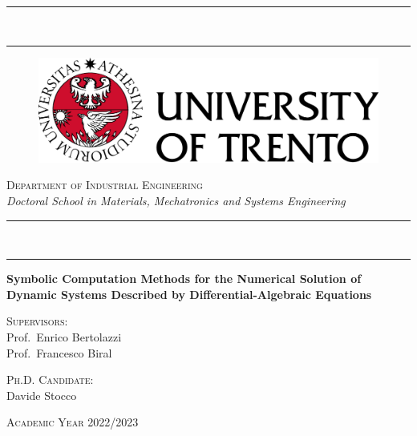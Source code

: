
\begin{titlepage}
%
\setlength\parindent{0pt}
\setlength{\topmargin}{-20mm}
\setlength{\voffset}{0mm}
%
\begin{center}
  \rule[0.1cm]{\textwidth}{0.6mm} \\ %
  \rule[0.5cm]{\textwidth}{0.3mm}
\end{center}
%
\vspace{-5mm}
%
\begin{figure}[htp]
  \centering
  \includegraphics[scale=0.5]{./figures/frontmatter/logo.png}
\end{figure}
%
\begin{center}
  \Large{\textsc{Department of Industrial Engineering}} \\
  \vspace{2mm}
  \large{\textsl{Doctoral School in Materials, Mechatronics and Systems Engineering}} \\
\end{center}
%
\begin{center}
  \rule[0.1cm]{\textwidth}{0.3mm} \\ %
  \rule[0.5cm]{\textwidth}{0.6mm}
\end{center}
%
\vfill
%
\begin{center}
  \huge{\textbf{Symbolic Computation Methods for the Numerical Solution of Dynamic Systems Described by Differential-Algebraic Equations}} \\
\end{center}
%
\vfill
%
\begin{minipage}[t]{0.49\textwidth}
  \large{\textsc{Supervisors:}} \\
  Prof.~Enrico Bertolazzi \\[0.05em]
  Prof.~Francesco Biral
\end{minipage}
\hfill
\begin{minipage}[t]{0.49\textwidth}\raggedleft
  \large{\textsc{Ph.D. Candidate:}} \\
  Davide Stocco
  \vspace{5mm}
\end{minipage}
%
\vfill
%
\begin{center}
  \large{\textsc{Academic Year 2022/2023}}
\end{center}

\end{titlepage}